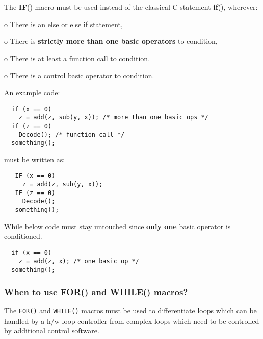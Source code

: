 The \textbf{IF}() macro must be used instead of the classical C
statement \textbf{if}(), wherever:
\begin{list}{}
\item o There is an else or else if statement, \item o There is
\textbf{strictly more than one basic operators} to condition, \item
o There is at least a function call to condition. \item o There is
a control basic operator to condition.
\end{list}
An example code:
{\small
\begin{verbatim}
  if (x == 0)
    z = add(z, sub(y, x)); /* more than one basic ops */
  if (z == 0)
    Decode(); /* function call */
  something();
\end{verbatim}}
must be written as:
{\small
\begin{verbatim}
   IF (x == 0)
     z = add(z, sub(y, x));
   IF (z == 0)
     Decode();
   something();
\end{verbatim}}

While below code must stay untouched since \textbf{only one} basic
operator
is conditioned.
{\small
\begin{verbatim}
  if (x == 0)
    z = add(z, x); /* one basic op */
  something();
\end{verbatim}}

\subsubsection{When to use FOR() and WHILE() macros?} 

The {\tt FOR()} and {\tt WHILE()} macros must be used to differentiate
loops which can be handled by a h/w loop controller from complex loops
which need to be controlled by additional control software.

\flushfloats

